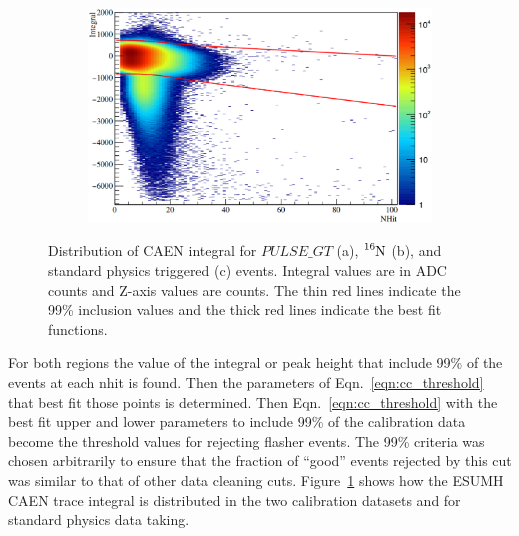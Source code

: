 \begin{appendices}
\begin{figure}[htbp]
    \begin{subfigure}[b]{0.50\textwidth}
        \centering
        \includegraphics[width=\textwidth]{caen_physics}
        \caption[]{}
    \end{subfigure}
    \caption[]{Distribution of CAEN integral for $PULSE\_GT$ (a), $\ce{^{16}N}$ (b), and
    standard physics triggered (c) events. Integral values are in ADC counts
    and Z-axis values are counts. The thin red lines indicate the 99\% inclusion
    values and the thick red lines indicate the best fit functions.}
    \label{fig:caen_inclusion}
\end{figure}

For both regions the value of the integral or peak height that include
99\% of the events at each nhit is found. Then the parameters of
Eqn.~\ref{eqn:cc_threshold} that best fit those points is determined.
Then Eqn.~\ref{eqn:cc_threshold} with the best fit upper and lower
parameters to include 99\% of the calibration data become the threshold
values for rejecting flasher events.
The 99\% criteria was chosen arbitrarily to ensure that the fraction of
``good'' events rejected by this cut was similar to that of other data
cleaning cuts.
Figure~\ref{fig:caen_inclusion} shows how the ESUMH CAEN trace integral is distributed
in the two calibration datasets and for standard physics data taking.




\end{appendices}
